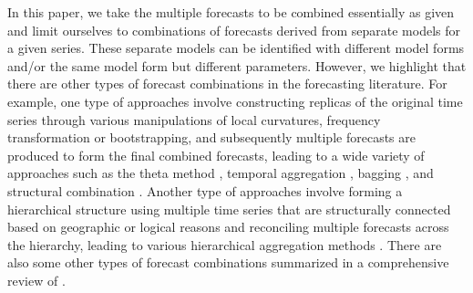 \documentclass[11pt]{article}
\begin{document}
In this paper, we take the multiple forecasts to be combined essentially as given and limit ourselves to combinations of forecasts derived from separate models for a given series. These separate models can be identified with different model forms and/or the same model form but different parameters. However, we highlight that there are other types of forecast combinations in the forecasting literature. For example, one type of approaches involve constructing replicas of the original time series through various manipulations of local curvatures, frequency transformation or bootstrapping, and subsequently multiple forecasts are produced to form the final combined forecasts, leading to a wide variety of approaches such as the theta method \citep{Assimakopoulos2000-cc}, temporal aggregation \citep[e.g.,][]{Kourentzes2014-wz,Kourentzes2016-qq,Kourentzes2017-xe}, bagging \citep[e.g.,][]{Bergmeir2016-ae,Petropoulos2018-fw}, and structural combination \citep[e.g.,][]{Rendon-Sanchez2019-qm}. Another type of approaches involve forming a hierarchical structure using multiple time series that are structurally connected based on geographic or logical reasons and reconciling multiple forecasts across the hierarchy, leading to various hierarchical aggregation methods \citep[e.g.,][]{Hyndman2011-sd,Wickramasuriya2019-fc,Taieb2021-tc,Hollyman2021-tn}. There are also some other types of forecast combinations summarized in a comprehensive review of \citet{Petropoulos2021-ft}.

% 
% 
\printbibliography
\end{document}
